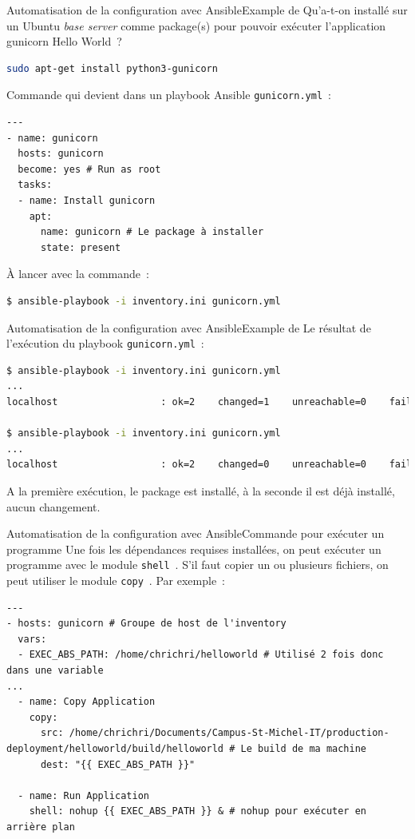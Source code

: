 \documentclass{beamer}
\begin{document}
    \begin{frame}[fragile]{Automatisation de la configuration avec Ansible}{Example de }
        Qu'a-t-on installé sur un Ubuntu \textit{base server} comme package(s) pour pouvoir exécuter l'application gunicorn Hello World~?
        \pause
        \begin{lstlisting}[language=bash]
sudo apt-get install python3-gunicorn
        \end{lstlisting}
        Commande qui devient dans un playbook Ansible \lstinline{gunicorn.yml}~:
        \begin{lstlisting}
---
- name: gunicorn
  hosts: gunicorn
  become: yes # Run as root
  tasks:
  - name: Install gunicorn
    apt:
      name: gunicorn # Le package à installer
      state: present
        \end{lstlisting}
        À lancer avec la commande~:
        \begin{lstlisting}[language=bash]
$ ansible-playbook -i inventory.ini gunicorn.yml
        \end{lstlisting}
    \end{frame}

    \begin{frame}[fragile]{Automatisation de la configuration avec Ansible}{Example de }
        Le résultat de l'exécution du playbook \lstinline{gunicorn.yml}~:
        \begin{lstlisting}[language=bash]
$ ansible-playbook -i inventory.ini gunicorn.yml
...
localhost                  : ok=2    changed=1    unreachable=0    failed=0    skipped=0    rescued=0    ignored=0

$ ansible-playbook -i inventory.ini gunicorn.yml
...
localhost                  : ok=2    changed=0    unreachable=0    failed=0    skipped=0    rescued=0    ignored=0
        \end{lstlisting}
        A la première exécution, le package est installé, à la seconde il est déjà installé, aucun changement.
    \end{frame}

    \begin{frame}[fragile]{Automatisation de la configuration avec Ansible}{Commande pour exécuter un programme}
        Une fois les dépendances requises installées, on peut exécuter un programme avec le module \lstinline{shell}~.
        \bigbreak
        S’il faut copier un ou plusieurs fichiers, on peut utiliser le module \lstinline{copy}~.
        \bigbreak
        Par exemple~:
        \begin{lstlisting}
---
- hosts: gunicorn # Groupe de host de l'inventory
  vars:
  - EXEC_ABS_PATH: /home/chrichri/helloworld # Utilisé 2 fois donc dans une variable
...
  - name: Copy Application
    copy:
      src: /home/chrichri/Documents/Campus-St-Michel-IT/production-deployment/helloworld/build/helloworld # Le build de ma machine
      dest: "{{ EXEC_ABS_PATH }}"

  - name: Run Application
    shell: nohup {{ EXEC_ABS_PATH }} & # nohup pour exécuter en arrière plan
        \end{lstlisting}
    \end{frame}
\end{document}
